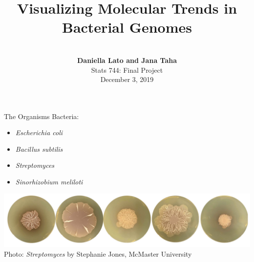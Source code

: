 \documentclass{beamer}
\title{\Huge Visualizing Molecular Trends in Bacterial Genomes}
\author[Daniella Lato]{\\ \textbf{Daniella Lato and Jana Taha}\\ Stats 744: Final Project\\ December 3, 2019}
\date[2017]{}
\makeatletter
\newcommand{\bi}{\begin{itemize}}
\newcommand{\ei}{\end{itemize}}
\newcommand{\itm}{\item<itm@1->}
\newcommand{\sm}{\textit{Sinorhizobium meliloti}\xspace}
\newcommand{\ecoli}{\textit{Escherichia coli}\xspace}
\newcommand{\bas}{\textit{Bacillus subtilis}\xspace}
\newcommand{\strep}{\textit{Streptomyces}\xspace}
\makeatother
\begin{document}
	\begin{frame}
		
		\titlepage
		
	\end{frame}
	
	
\begin{frame}{The Organisms}
	Bacteria:
	\bi
	\itm \ecoli
	\itm \bas
	\itm \strep
	\itm \sm
	\ei
	\vfill
	
	\includegraphics[width=\textwidth]{strep_pic}
%		
\centering
		{\centering \tiny Photo: \strep by Stephanie Jones, McMaster University}
\end{frame}
\end{document}
